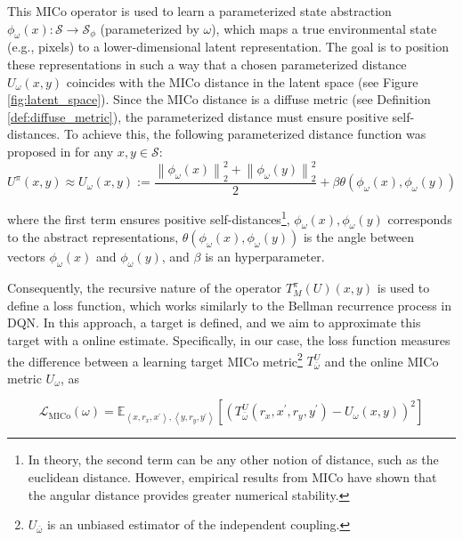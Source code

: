
This MICo operator is used to learn a parameterized state abstraction \(\phi_\omega(x) : \mathcal{S} \to \mathcal{S}_\phi\) (parameterized by \(\omega\)), which maps a true environmental state (e.g., pixels) to a lower-dimensional latent representation. The goal is to position these representations in such a way that a chosen parameterized distance $U_\omega(x,y)$ coincides with the MICo distance in the latent space (see Figure \ref{fig:latent_space}). Since the MICo distance is a diffuse metric (see Definition \ref{def:diffuse_metric}), the parameterized distance must ensure positive self-distances. To achieve this, the following parameterized distance function was proposed in \cite{castro2021mico} for any \(x, y \in \mathcal{S}\):
\begin{equation}
    U^\pi(x, y) \approx U_\omega(x, y):=\frac{\left\|\phi_\omega(x)\right\|_2^2+\left\|\phi_\omega(y)\right\|_2^2}{2}+\beta \theta\left(\phi_\omega(x), \phi_\omega(y)\right)
\end{equation}

where the first term ensures positive self-distances\footnote{In theory, the second term can be any other notion of distance, such as the euclidean distance. However, empirical results from MICo\cite{castro2021mico} have shown that the angular distance provides greater numerical stability.}, $\phi_\omega(x), \phi_\omega(y)$ corresponds to the abstract representations, $\theta\left(\phi_\omega(x), \phi_\omega(y)\right)$ is the angle between vectors $\phi_\omega(x)$ and $\phi_\omega(y)$, and $\beta$ is an hyperparameter.

Consequently, the recursive nature of the operator \(T_M^\pi(U)(x,y)\) is used to define a loss function, which works similarly to the Bellman recurrence process in DQN. In this approach, a target is defined, and we aim to approximate this target with a online estimate. Specifically, in our case, the loss function measures the difference between a learning target MICo metric\footnote{\(U_{\bar{\omega}}\) is an unbiased estimator of the independent coupling.} \(T_{\bar{\omega}}^U\) and the online MICo metric \(U_\omega\), as 

\begin{equation}
\label{eq:mico_loss}
    \mathcal{L}_{\mathrm{MICo}}(\omega)=\mathbb{E}_{\left\langle x, r_x, x^{\prime}\right\rangle,\left\langle y, r_y, y^{\prime}\right\rangle}\left[\left(T_{\bar{\omega}}^U\left(r_x, x^{\prime}, r_y, y^{\prime}\right)-U_\omega(x, y)\right)^2\right]
\end{equation}

